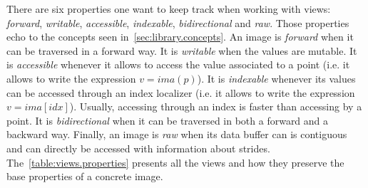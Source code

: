 There are six properties one want to keep track when working with views: \emph{forward}, \emph{writable},
\emph{accessible}, \emph{indexable}, \emph{bidirectional} and \emph{raw}. Those properties echo to the concepts seen
in~\cref{sec:library.concepts}. An image is \emph{forward} when it can be traversed in a forward way. It is
\emph{writable} when the values are mutable. It is \emph{accessible} whenever it allows to access the value associated
to a point (i.e. it allows to write the expression $v = ima(p)$). It is \emph{indexable} whenever its values can be
accessed through an index localizer (i.e. it allows to write the expression $v = ima[idx]$). Usually, accessing through
an index is faster than accessing by a point. It is \emph{bidirectional} when it can be traversed in both a forward and
a backward way. Finally, an image is \emph{raw} when its data buffer can is contiguous and can directly be accessed with
information about strides. The~\cref{table:views.properties} presents all the views and how they preserve the base
properties of a concrete image.

